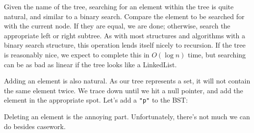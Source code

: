 \documentclass[11pt]{book}
\begin{document}
Given the name of the tree, searching for an element within the tree is quite natural, and similar to a binary search. Compare the element to be searched for with the current node. If they are equal, we are done; otherwise, search the appropriate left or right subtree. As with most structures and algorithms with a binary search structure, this operation lends itself nicely to recursion. If the tree is reasonably nice, we expect to complete this in $O(\log{n})$ time, but searching can be as bad as linear if the tree looks like a LinkedList.

Adding an element is also natural. As our tree represents a set, it will not contain the same element twice. We trace down until we hit a null pointer, and add the element in the appropriate spot. Let's add a \texttt{"p"} to the BST:

\begin{center}
\end{center}

Deleting an element is the annoying part. Unfortunately, there's not much we can do besides casework.

\begin{center}
\end{center}
\end{document}
